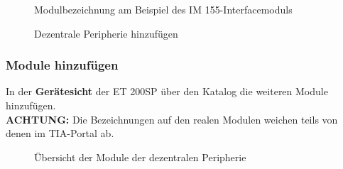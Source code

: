 \begin{figure}[H]
    \centering
   \begin{minipage}[b]{.4\linewidth}
        \centering
        \caption[Modulbezeichnung am Beispiel des IM 155-Interfacemoduls]{Modulbezeichnung am Beispiel des IM 155-Interfacemoduls}
        \label{fig:Bild6.20}
   \end{minipage}
   \hspace{.1\linewidth}%
   \begin{minipage}[b]{.4\linewidth}
        \centering
        \caption[Dezentrale Peripherie hinzufügen]{Dezentrale Peripherie hinzufügen\\}
        \label{fig:Bild6.21}
   \end{minipage}
\end{figure}

\clearpage

\subsubsection{Module hinzufügen}
In der \textbf{Gerätesicht} der ET 200SP über den Katalog die weiteren Module hinzufügen.\\
\textbf{ACHTUNG:} Die Bezeichnungen auf den realen Modulen weichen teils von denen im TIA-Portal ab.

\begin{figure}[H]
   \centering
   \caption[Übersicht der Module der dezentralen Peripherie]{Übersicht der Module der dezentralen Peripherie}
   \label{fig:Bild6.22}
\end{figure}

